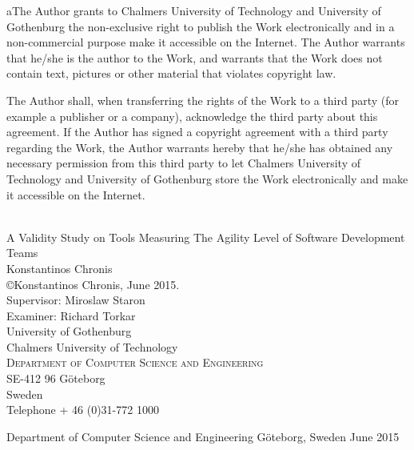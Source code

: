 \begin{author}
aThe Author grants to Chalmers University of Technology and University of Gothenburg  the non-exclusive right to publish the Work electronically and in a non-commercial purpose make it accessible on the Internet. 
The Author warrants that he/she is the author to the Work, and warrants that the Work does not contain text, pictures or other material that violates copyright law. 

The Author shall, when transferring the rights of the Work to a third party (for example a publisher or a company), acknowledge the third party about this agreement. If the Author has signed a copyright agreement with a third party regarding the Work, the Author warrants hereby that he/she has obtained any necessary permission from this third party to let Chalmers University of Technology and University of Gothenburg  store the Work electronically and make it accessible on the Internet. 
  
  \begin{flushleft}
    { \\[0.5cm] {\Large A Validity Study on Tools Measuring The Agility Level of Software Development Teams}} \\[0.5cm]
  
    Konstantinos Chronis \\[.2cm]
  
    {\copyright Konstantinos Chronis, June 2015.}\\[.2cm]
    
    Supervisor: Miroslaw Staron \\[.2cm] 
    Examiner: Richard Torkar \\[.5cm]
          
    {\Large University of Gothenburg  \\
    		Chalmers University of Technology  \\
      \textsc{Department of Computer Science and Engineering} \\
      SE-412 96 Göteborg \\
      Sweden \\
      Telephone + 46 (0)31-772 1000 \\
    } 
    
    Department of Computer Science and Engineering
	Göteborg, Sweden June 2015
	
  \end{flushleft} 
\end{author}


